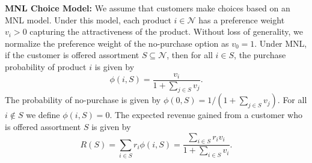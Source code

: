 \documentclass[mnsc,non-blindrev]{informs3}
\theoremstyle{definition}
\begin{document}
\noindent\textbf{MNL Choice Model:} We assume that customers make choices based on an MNL model. Under this model, each product $i\in\mathcal{N}$ has a preference weight $v_i>0$ capturing the attractiveness of the product. Without loss of generality, we normalize the preference weight of the no-purchase option as $v_0=1$. Under MNL, if the customer is offered assortment $S\subseteq\mathcal{N}$, then for all $i\in S$, the purchase probability of product $i$ is given by
\begin{equation*}
\phi(i,S)=\dfrac{v_i}{1+\sum_{j\in S}v_j}.
\end{equation*}
The probability of no-purchase is given by $\phi(0,S)=1/(1+\sum_{j\in S}v_j)$. For all $i\notin S$ we define $\phi(i,S)=0$. The expected revenue gained from a customer who is offered assortment $S$ is given by
\begin{equation}
R(S)=\sum_{i\in S}r_i\phi(i,S)=\dfrac{\sum_{i\in S}r_iv_i}{1+\sum_{i\in S}v_i}.\label{eq:expected_revenue}
\end{equation}
\end{document}
